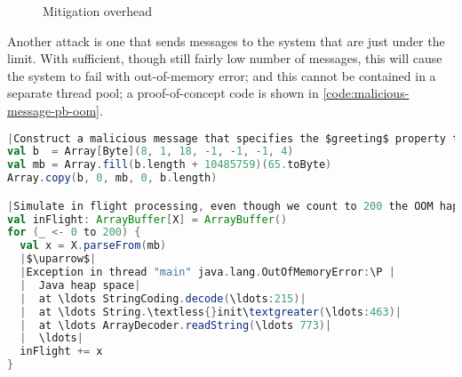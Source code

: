 \begin{figure}[h]
  \caption{Mitigation overhead}
  \label{plot:mitigation-overhead}
\end{figure}

Another attack is one that sends messages to the system that are just under the  limit. With sufficient, though still fairly low number of messages, this will cause the system to fail with out-of-memory error; and this cannot be contained in a separate thread pool; a proof-of-concept code is shown in \autoref{code:malicious-message-pb-oom}.

\begin{lstlisting}[caption={Malicious message}, label={code:malicious-message-pb-oom}, language=Scala, escapechar=|]
|Construct a malicious message that specifies the $greeting$ property to be a string of $10485759$ characters. The eager parser makes a copy of the entire buffer, the streaming parser reads \& allocates the memory by chunks.|
val b  = Array[Byte](8, 1, 18, -1, -1, -1, 4)
val mb = Array.fill(b.length + 10485759)(65.toByte)
Array.copy(b, 0, mb, 0, b.length)

|Simulate in flight processing, even though we count to 200 the OOM happens around 165|
val inFlight: ArrayBuffer[X] = ArrayBuffer()
for (_ <- 0 to 200) {
  val x = X.parseFrom(mb)
  |$\uparrow$|
  |Exception in thread "main" java.lang.OutOfMemoryError:\P |
  |  Java heap space|
  |  at \ldots StringCoding.decode(\ldots:215)|
  |  at \ldots String.\textless{}init\textgreater(\ldots:463)|
  |  at \ldots ArrayDecoder.readString(\ldots 773)|
  |  \ldots|
  inFlight += x
}
\end{lstlisting}


